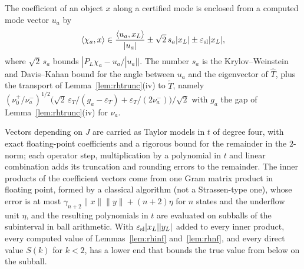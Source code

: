 \noindent The coefficient of an object $x$ along a certified mode is enclosed from a computed mode vector $u_a$ by
\[
\langle\chi_a,x\rangle\in\frac{\langle u_a,x_L\rangle}{|u_a|}\pm\sqrt2\,s_a|x_L|\pm\varepsilon_{\rm sl}|x_L|,
\]
where $\sqrt2\,s_a$ bounds $|P_L\chi_a-u_a/|u_a||$. The number $s_a$ is the Krylov--Weinstein and Davis--Kahan bound for the angle between $u_a$ and the
eigenvector of $\hat T$, plus the transport of Lemma~\ref{lem:rhtrunc}(iv) to $\tilde T$, namely
$(\nu_0^+/\nu_a^-)^{1/2}\big(\sqrt2\,\varepsilon_T/(g_a-\varepsilon_T)+\varepsilon_T/(2\nu_a^-)\big)/\sqrt2$ with $g_a$ the gap of Lemma~\ref{lem:rhtrunc}(iv)
for $\nu_a$.

\noindent Vectors depending on $J$ are carried as Taylor models in $t$ of degree four, with exact floating-point coefficients and a rigorous bound for the
remainder in the $2$-norm; each operator step, multiplication by a polynomial in $t$ and linear combination adds its truncation and rounding errors to
the remainder. The inner products of the coefficient vectors come from one Gram matrix product in floating point, formed by a classical algorithm (not a
Strassen-type one), whose error is at most
$\gamma_{n+2}\|x\|\|y\|+(n+2)\eta$ for $n$ states and the underflow unit $\eta$, and the resulting polynomials in $t$ are evaluated on subballs of the
subinterval in ball arithmetic. With $\varepsilon_{\rm sl}|x_L||y_L|$ added to every inner product, every computed value of Lemmas~\ref{lem:rhinf}
and~\ref{lem:rhnf}, and every direct value $S(k)$ for $k<2$, has a lower end that bounds the true value from below on the subball.

